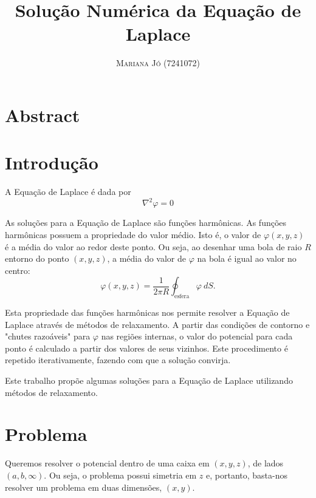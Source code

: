 \documentclass[a4paper,12pt]{article}
\title{\vspace{-18mm}\fontsize{18pt}{20pt}\selectfont\textbf{
                    Solução Numérica da Equação de Laplace}} %
\author{
\large
\textsc{Mariana Jó (7241072)}\\
\vspace{-20pt}
}
\date{}
\begin{document}
\maketitle
\thispagestyle{fancy}

\section*{Abstract}

\section{Introdução}

A Equação de Laplace é dada por
\begin{equation}
\nabla^2 \varphi = 0
\label{eq:laplace}
\end{equation}

As soluções para a Equação de Laplace são funções harmônicas. As funções harmônicas
possuem a propriedade do valor médio. Isto é, o valor de $\varphi (x, y, z)$ é a média
do valor ao redor deste ponto. Ou seja, ao desenhar uma bola de raio $R$ entorno do
ponto $(x, y, z)$, a média do valor de $\varphi$ na bola é igual ao valor no centro\cite{grif}:
\begin{equation*}
  \varphi(x, y, z) = \frac{1}{2\pi R}\oint_{\text{esfera}}\varphi \ dS.
\end{equation*}

Esta propriedade das funções harmônicas nos permite resolver a Equação de Laplace
através de métodos de relaxamento. A partir das condições de contorno e "chutes razoáveis" para $\varphi$ nas regiões internas, o valor do potencial para
cada ponto é calculado a partir dos valores de seus vizinhos. Este procedimento é
repetido iterativamente, fazendo com que a solução convirja.

Este trabalho propõe algumas soluções para a Equação de Laplace utilizando métodos de relaxamento.


\section{Problema}


Queremos resolver o potencial dentro de uma caixa em $(x, y, z)$, de lados $(a, b, \infty)$. Ou seja, o problema possui simetria em $z$ e, portanto, basta-nos resolver um problema em duas dimensões, $(x, y)$.
\end{document}

